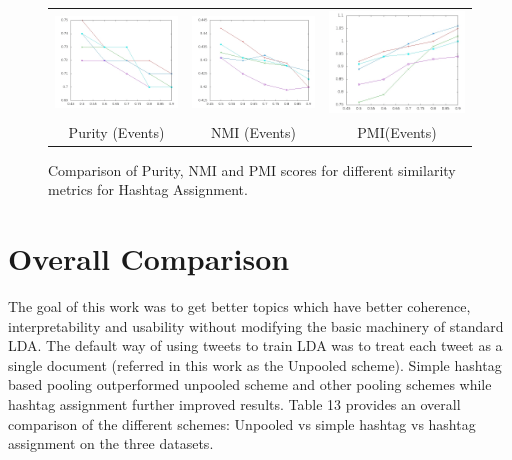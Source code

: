 \documentclass[10pt,a5paper,twoside]{article}
\begin{document}
\begin{figure}[t!]
\begin{center}
{\begin{tabular}{ccc}
		\includegraphics[width=140pt]{Figs/3-1.jpg} & 
		\includegraphics[width=140pt]{Figs/3-2.jpg} & 
		\includegraphics[width=140pt]{Figs/3-3.jpg} \\

		

		{\footnotesize Purity (Events)} & {\footnotesize NMI (Events)} & 
		{\footnotesize PMI(Events)}\\

	
	\end{tabular}
}
\end{center}
\vspace{-4mm}
\caption{\footnotesize Comparison of Purity, NMI and PMI scores for different similarity metrics for Hashtag Assignment.} \label{fig:dist}
\end{figure}




\section{Overall Comparison}
The goal of this work was to get better topics which have better coherence, interpretability and usability without modifying the basic machinery of standard LDA. The default way of using tweets to train LDA was to treat each tweet as a single document (referred in this work as the Unpooled scheme). Simple hashtag based pooling outperformed unpooled scheme and other pooling schemes while hashtag assignment further improved results. Table 13 provides an overall comparison of the different schemes: Unpooled vs simple hashtag vs hashtag assignment on the three datasets.
\end{document}
